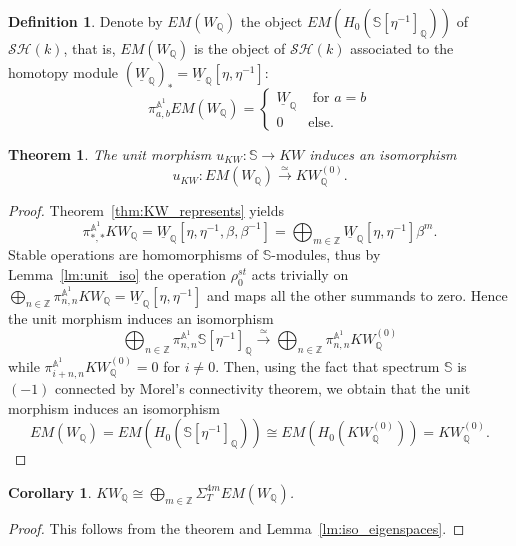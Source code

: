 \documentclass[a4paper,12pt,draft]{amsart}
\newtheorem{theorem}{Theorem}
\newtheorem{corollary}{Corollary}
\theoremstyle{definition}
\newtheorem{definition}{Definition}
\theoremstyle{remark}
\begin{document}
\begin{definition}
Denote by  $EM(W_{{\mathbb Q}})$ the object $EM(H_0(\mathbb{S}[\eta^{-1}]_{{\mathbb Q}}))$ of ${\mathcal{SH}}(k)$, that is,  $EM(W_{{\mathbb Q}})$ is the  object of ${\mathcal{SH}}(k)$ associated to the homotopy module $(\underline{W}_{{\mathbb Q}})_*=\underline{W}_{{\mathbb Q}}[\eta,\eta^{-1}]$:
\[
\pi^{{{\mathbb A}}^1}_{a,b}EM(W_{{\mathbb Q}})=\begin{cases}\underline{W}_{{\mathbb Q}}&\text{ for }a=b\\0&\text{else.}\end{cases}
\]
\end{definition}

\begin{theorem} \label{thm:decompose_KW}
The unit morphism $u_{KW}\colon  \mathbb{S} \to KW$ induces an isomorphism
\[
u_{KW}\colon EM(W_{{\mathbb Q}}) \xrightarrow{\simeq} KW^{(0)}_{{\mathbb Q}}.
\]
\end{theorem}
\begin{proof}
Theorem~\ref{thm:KW_represents} yields 
\[
\pi^{{{\mathbb A}}^1}_{*,*} KW_{{\mathbb Q}} = \underline{W}_{{\mathbb Q}}[\eta,\eta^{-1},\beta,\beta^{-1}]=\bigoplus_{m\in {{\mathbb Z}}} \underline{W}_{{\mathbb Q}}[\eta,\eta^{-1}]\beta^m.
\]
Stable operations are homomorphisms of $\mathbb{S}$-modules, thus by Lemma~\ref{lm:unit_iso} the operation $\rho_0^{st}$ acts trivially on $\bigoplus_{n\in {{\mathbb Z}}}\pi^{{{\mathbb A}}^1}_{n,n} KW_{{\mathbb Q}} = \underline{W}_{{\mathbb Q}}[\eta,\eta^{-1}]$ and maps all the other summands to zero. Hence the unit morphism induces an isomorphism 
\[
\bigoplus_{n\in {{\mathbb Z}}} \pi^{{{\mathbb A}}^1}_{n,n} \mathbb{S}[\eta^{-1}]_{{\mathbb Q}} \xrightarrow{\simeq} \bigoplus_{n\in {{\mathbb Z}}} \pi^{{{\mathbb A}}^1}_{n,n} KW_{{\mathbb Q}}^{(0)} 
\]
while $\pi^{{{\mathbb A}}^1}_{i+n,n} KW_{{\mathbb Q}}^{(0)}=0$ for $i\neq 0$. Then, using the fact that spectrum $\mathbb{S}$ is $(-1)$ connected by Morel's connectivity theorem, we obtain that the unit morphism induces an isomorphism
\[
EM(W_{{\mathbb Q}}) =EM(H_0( \mathbb{S}[\eta^{-1}]_{{\mathbb Q}}))\cong  EM(H_0(KW_{{\mathbb Q}}^{(0)})) = KW_{{\mathbb Q}}^{(0)}.
\]
\end{proof}

\begin{corollary}\label{cor:WittDecomp}
$KW_{{\mathbb Q}} \cong \bigoplus_{m\in {{\mathbb Z}}} \Sigma_T^{4m} EM(W_{{\mathbb Q}})$.
\end{corollary}
\begin{proof}
This follows from the theorem and Lemma~\ref{lm:iso_eigenspaces}.
\end{proof}
\end{document}
